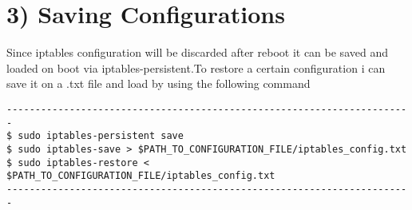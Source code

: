 \documentclass{article}
\begin{document}
\section*{3) Saving Configurations}
Since iptables configuration will be discarded after reboot it can be saved and loaded on boot via iptables-persistent.To restore a certain configuration i can save it on a .txt file and load by using the following command\\

\begin{verbatim}
-----------------------------------------------------------------------
$ sudo iptables-persistent save
$ sudo iptables-save > $PATH_TO_CONFIGURATION_FILE/iptables_config.txt
$ sudo iptables-restore < $PATH_TO_CONFIGURATION_FILE/iptables_config.txt
-----------------------------------------------------------------------
\end{verbatim}
\end{document}
